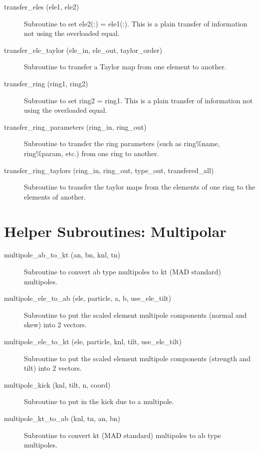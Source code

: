 \begin{description}
\item[transfer\_eles (ele1, ele2)] \Newline 
     Subroutine to set ele2(:) = ele1(:). 
     This is a plain transfer of information not using the overloaded equal.

\item[transfer\_ele\_taylor (ele\_in, ele\_out, taylor\_order)] \Newline 
     Subroutine to transfer a Taylor map from one element to another.

\item[transfer\_ring (ring1, ring2)] \Newline 
     Subroutine to set ring2 = ring1. 
     This is a plain transfer of information not using the overloaded equal.

\item[transfer\_ring\_parameters (ring\_in, ring\_out)] \Newline
Subroutine to transfer the ring parameters (such as ring\%name, 
ring\%param, etc.) from one ring to another. 

\item[transfer\_ring\_taylors (ring\_in, ring\_out, 
                        type\_out, transfered\_all) ] \Newline 
Subroutine to transfer the taylor maps from the elements of one ring to
the elements of another. 

\end{description}

\section{Helper Subroutines: Multipolar}
\label{r:multi}    

\begin{description}

\item[multipole\_ab\_to\_kt (an, bn, knl, tn)] \Newline
Subroutine to convert ab type multipoles to kt (MAD standard) multipoles. 

\item[multipole\_ele\_to\_ab (ele, particle, a, b, use\_ele\_tilt)] \Newline
Subroutine to put the scaled element multipole components (normal and skew) into 2 vectors. 

\item[multipole\_ele\_to\_kt (ele, particle, knl, tilt, use\_ele\_tilt)] \Newline
Subroutine to put the scaled element multipole components (strength and tilt) into 2 vectors. 

\item[multipole\_kick (knl, tilt, n, coord)] \Newline
Subroutine to put in the kick due to a multipole. 

\item[multipole\_kt\_to\_ab (knl, tn, an, bn)] \Newline
Subroutine to convert kt (MAD standard) multipoles to ab type multipoles. 

\end{description}

